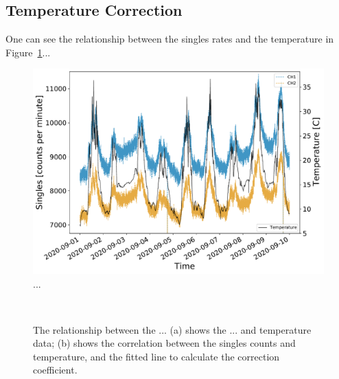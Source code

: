 \subsection{Temperature Correction}\label{sec:HS_14008_T_corr}

One can see the relationship between the singles rates and the temperature in Figure~\ref{fig:HS_14008_temperature_vs_CR}...

\begin{figure}[ht!]
	\centering
	\includegraphics[width=0.75\columnwidth]{HS_14008_CR_v_T_sept2020.pdf}
	\caption{...}
	\label{fig:HS_14008_temperature_vs_CR}
\end{figure}




\begin{figure}[ht!]
	\centering
	 \\
	
	\caption{The relationship between the ... (a) shows the ... and temperature data; (b) shows the correlation between the singles counts and temperature, and the fitted line to calculate the correction coefficient.}
	\label{fig:14008_CR_V_T_corr}
\end{figure}


